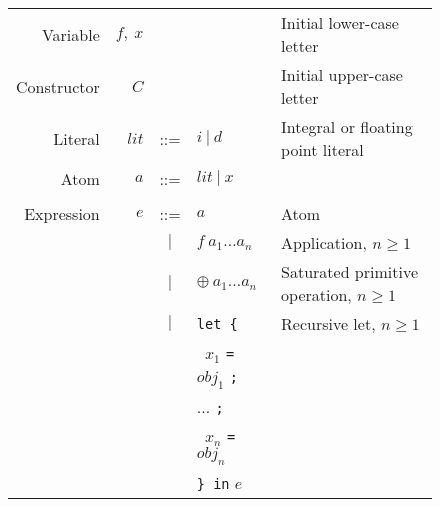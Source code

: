 \documentclass{llncs}
\begin{document}
\setlength{\tabcolsep}{5pt}
\begin{figure}
\begin{centering}
\footnotesize %
\begin{tabular}{r r c l l}

Variable     & $f,\ x$        &     &                                              & Initial lower-case letter \\
Constructor  & $C$            &     &                                              & Initial upper-case letter \\
Literal      & $\mathit{lit}$ & ::= & $i\ |\ d$                                    & Integral or floating point literal \\
Atom         & $a$            & ::= & $\mathit{lit}\ |\ x$                         & \\ %
\\
Expression   & $e$            & ::= & $a$                                          & Atom \\
             &                & $|$ & $f\ a_1\dots a_n$                            & Application, $n\ge 1$ \\
             &                & $|$ & $\oplus\ a_1\dots a_n$                       & Saturated primitive operation, $n\ge 1$ \\

             &                & $|$ & \texttt{let \{}                              & Recursive let, $n\ge 1$ \\
             &                &     & \texttt{ } $x_1$ \texttt{=} $\mathit{obj}_1$ \texttt{;} \\
             &                &     & \hspace{0.2in} $\dots$ \texttt{;} \\
             &                &     & \texttt{ } $x_n$ \texttt{=} $\mathit{obj}_n$ \\
             &                &     & \texttt{\} in} $e$  \\


\end{tabular}
\end{centering}
\end{figure}
\end{document}
